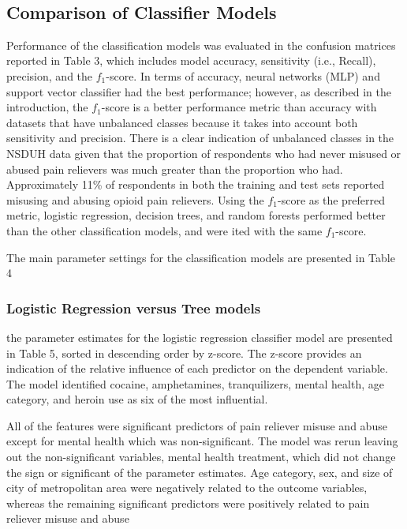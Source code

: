 \\\documentclass[sigconf]{acmart}
\begin{document}
\subsection{Comparison of Classifier Models}

Performance of the classification models was evaluated in the confusion 
matrices reported in Table 3, which includes model accuracy, sensitivity 
(i.e., Recall), precision, and the $f_1$-score. In terms of accuracy, neural
networks (MLP) and support vector classifier had the best performance; 
however, as described in the introduction, the $f_1$-score is a better 
performance metric than accuracy with datasets that have unbalanced classes 
because it takes into account both sensitivity and precision. There is a 
clear indication of unbalanced classes in the NSDUH data given that the 
proportion of respondents who had never misused or abused pain relievers 
was much greater than the proportion who had. Approximately 11\% of 
respondents in both the training and test sets reported misusing and abusing 
opioid pain relievers. Using the $f_1$-score as the preferred metric, logistic
regression, decision trees, and random forests performed better than the other 
classification models, and were ited with the same $f_1$-score. 

The main parameter settings for the classification models are presented in 
Table 4


\subsubsection{Logistic Regression versus Tree models}
 
the parameter estimates for the logistic regression classifier model are 
presented in Table 5, sorted in descending order by z-score. The z-score
provides an indication of the relative influence of each predictor on the 
dependent variable. The model identified cocaine, amphetamines, tranquilizers,
mental health, age category, and heroin use as six of the most influential.

All of the features were significant predictors of pain reliever misuse and abuse
except for mental health which was non-significant.   The model was rerun leaving out 
the non-significant variables, mental health 
treatment, which did not change the sign or significant of the parameter estimates. 
Age category, sex, and size of city of metropolitan area were negatively related
to the outcome variables, whereas the remaining significant predictors were 
positively related to pain reliever misuse and abuse
\end{document}
